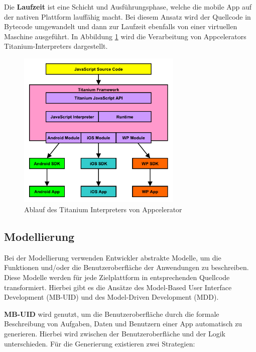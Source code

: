 \bigskip
Die \textbf{Laufzeit} ist eine Schicht und Ausführungsphase, welche die mobile App auf der nativen Plattform lauffähig macht. Bei diesem Ansatz wird der Quellcode in Bytecode umgewandelt und dann zur Laufzeit ebenfalls von einer virtuellen Maschine ausgeführt. In Abbildung \ref{graph_interpreter_Titanium} wird die Verarbeitung von Appcelerators Titanium-Interpreters dargestellt.

\begin{figure}[htbp]
	\centering
	\includegraphics[width=0.7\textwidth]{Bilder/Interpretation_Runtime_Titanium}
	\caption{Ablauf des Titanium Interpreters von Appcelerator}\label{graph_interpreter_Titanium}
\end{figure}

\subsection{Modellierung}
Bei der Modellierung verwenden Entwickler abstrakte Modelle, um die Funktionen und/oder die Benutzeroberfläche der Anwendungen zu beschreiben. Diese Modelle werden für jede Zielplattform in entsprechenden Quellcode transformiert. Hierbei gibt es die Ansätze des Model-Based User Interface Development (MB-UID) und des Model-Driven Development (MDD).

\bigskip
\textbf{MB-UID} wird genutzt, um die Benutzeroberfläche durch die formale Beschreibung von Aufgaben, Daten und Benutzern einer App automatisch zu generieren. Hierbei wird zwischen der Benutzeroberfläche und der Logik unterschieden.
Für die Generierung existieren zwei Strategien:


